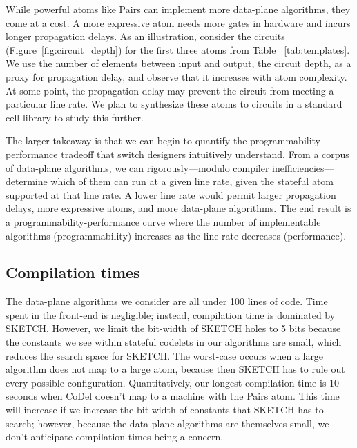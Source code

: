 While powerful atoms like Pairs can implement more data-plane algorithms, they
come at a cost.  A more expressive atom needs more gates in hardware and incurs
longer propagation delays.  As an illustration, consider the circuits
(Figure~\ref{fig:circuit_depth}) for the first three atoms from Table
~\ref{tab:templates}. We use the number of elements between input and output,
the circuit depth, as a proxy for propagation delay, and observe that it
increases with atom complexity. At some point, the propagation delay may
prevent the circuit from meeting a particular line rate.  We plan to synthesize
these atoms to circuits in a standard cell library to study this further.

The larger takeaway is that we can begin to quantify the
programmability-performance tradeoff that switch designers intuitively
understand. From a corpus of data-plane algorithms, we can rigorously---modulo
compiler inefficiencies---determine which of them can run at a given line rate,
given the stateful atom supported at that line rate. A lower line rate would
permit larger propagation delays, more expressive atoms, and more data-plane
algorithms. The end result is a programmability-performance curve where the
number of implementable algorithms (programmability) increases as the line rate
decreases (performance).

\subsection{Compilation times}
The data-plane algorithms we consider are all under 100 lines of code.  Time
spent in the front-end is negligible; instead, compilation time is dominated by
SKETCH. However, we limit the bit-width of SKETCH holes to 5 bits because the
constants we see within stateful codelets in our algorithms are small, which
reduces the search space for SKETCH.  The worst-case occurs when a large
algorithm does not map to a large atom, because then SKETCH has to rule out
every possible configuration.  Quantitatively, our longest compilation time is
10 seconds when CoDel doesn't map to a \absmachine machine with the Pairs atom.
This time will increase if we increase the bit width of constants that SKETCH
has to search; however, because the data-plane algorithms are themselves small,
we don't anticipate compilation times being a concern.
